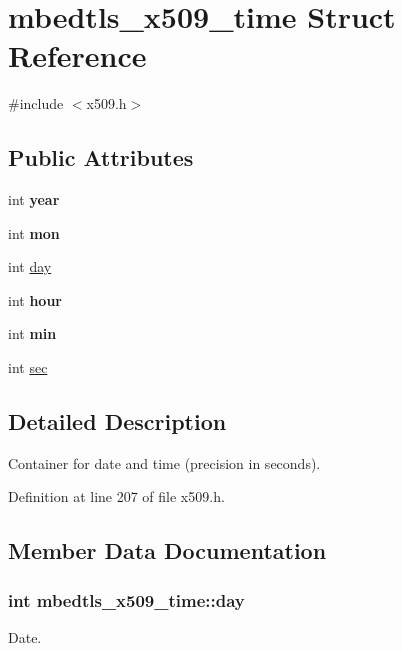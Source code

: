 \hypertarget{structmbedtls__x509__time}{\section{mbedtls\-\_\-x509\-\_\-time Struct Reference}
\label{structmbedtls__x509__time}
}


{\ttfamily \#include $<$x509.\-h$>$}

\subsection*{Public Attributes}
\begin{DoxyCompactItemize}
\item 
\hypertarget{structmbedtls__x509__time_a8a7e1d3481392216ebf374174ad9391f}{int {\bfseries year}}\label{structmbedtls__x509__time_a8a7e1d3481392216ebf374174ad9391f}

\item 
\hypertarget{structmbedtls__x509__time_aea98403aec3bfd6790c308f3a7f36add}{int {\bfseries mon}}\label{structmbedtls__x509__time_aea98403aec3bfd6790c308f3a7f36add}

\item 
int \hyperlink{structmbedtls__x509__time_a20712c77a94123d4610c87d6863cf092}{day}
\item 
\hypertarget{structmbedtls__x509__time_a163b3884c0b321a1d5cccf85ab79ad76}{int {\bfseries hour}}\label{structmbedtls__x509__time_a163b3884c0b321a1d5cccf85ab79ad76}

\item 
\hypertarget{structmbedtls__x509__time_aa4a3bcdc60bbdc3a3bb346ae65c89b65}{int {\bfseries min}}\label{structmbedtls__x509__time_aa4a3bcdc60bbdc3a3bb346ae65c89b65}

\item 
int \hyperlink{structmbedtls__x509__time_a267d51d8fbecde50b06b883db7f98ec2}{sec}
\end{DoxyCompactItemize}


\subsection{Detailed Description}
Container for date and time (precision in seconds). 

Definition at line 207 of file x509.\-h.



\subsection{Member Data Documentation}
\hypertarget{structmbedtls__x509__time_a20712c77a94123d4610c87d6863cf092}{
\subsubsection[{day}]{\setlength{\rightskip}{0pt plus 5cm}int mbedtls\-\_\-x509\-\_\-time\-::day}}\label{structmbedtls__x509__time_a20712c77a94123d4610c87d6863cf092}
Date. 

